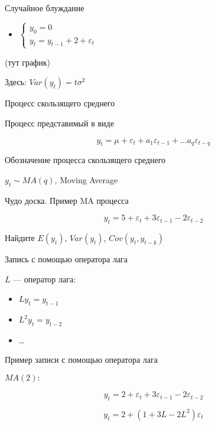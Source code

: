 \documentclass[ignorenonframetext,]{beamer}
\begin{document}
\begin{frame}{Случайное блуждание}

\begin{itemize}
\itemsep1pt\parskip0pt
\item
  $\begin{cases} y_0 = 0 \\ y_t = y_{t-1} + 2 + \varepsilon_t \end{cases}$
\end{itemize}

(тут график)

Здесь: $Var(y_t)=t \sigma^2 $

\end{frame}

\begin{frame}{Процесс скользящего среднего}

Процесс представимый в виде

\[
y_t= \mu + \varepsilon_t + a_1 \varepsilon_{t-1} + \ldots a_q \varepsilon_{t-q}
\]

\end{frame}

\begin{frame}{Обозначение процесса скользящего среднего}

$y_t \sim MA(q)$, Moving Average

\end{frame}

\begin{frame}{Чудо доска. Пример MA процесса}

\[
y_t = 5 + \varepsilon_t + 3 \varepsilon_{t-1} -2\varepsilon_{t-2}
\]

Найдите $E(y_t)$, $Var(y_t)$, $Cov(y_t,y_{t-k})$

\end{frame}

\begin{frame}{Запись с помощью оператора лага}

$L$ --- оператор лага:

\begin{itemize}
\item
  $Ly_t=y_{t-1}$
\item
  $L^2y_t=y_{t-2}$
\item
  \ldots
\end{itemize}

\end{frame}

\begin{frame}{Пример записи с помощью оператора лага}

$MA(2):$

\[
y_t= 2 + \varepsilon_t + 3\varepsilon_{t-1}-2\varepsilon_{t-2}
\]

\[
y_t= 2 +(1+3L-2L^2)\varepsilon_t
\]

\end{frame}
\end{document}
